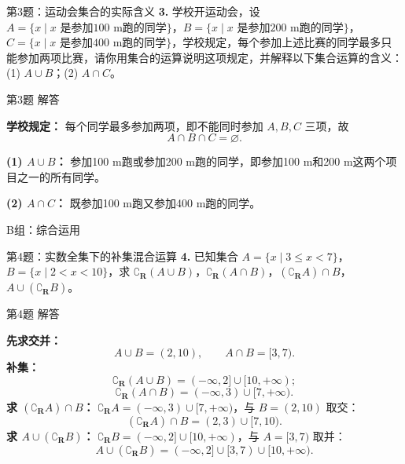 \documentclass[10pt,aspectratio=169,serif]{beamer}
\begin{document}
\begin{frame}[t]{第3题：运动会集合的实际含义}
\textbf{3.} 学校开运动会，设 $A = \{x \mid x \text{ 是参加100 m跑的同学}\}$，$B = \{x \mid x \text{ 是参加200 m跑的同学}\}$，$C = \{x \mid x \text{ 是参加400 m跑的同学}\}$，学校规定，每个参加上述比赛的同学最多只能参加两项比赛，请你用集合的运算说明这项规定，并解释以下集合运算的含义：\\
(1) $A \cup B$；\qquad (2) $A \cap C$。
\end{frame}

\begin{frame}[t]{第3题 解答}
\begin{tcolorbox}[colback=orange!10,colframe=orange,title=\textbf{解}]
\textbf{学校规定：} 每个同学最多参加两项，即不能同时参加 $A,B,C$ 三项，故
\[
A \cap B \cap C = \varnothing.
\]

\textbf{(1) $A \cup B$：} 参加100 m跑\alert{或}参加200 m跑的同学，即参加100 m和200 m这两个项目之一的所有同学。

\textbf{(2) $A \cap C$：} 既参加100 m跑\alert{又}参加400 m跑的同学。
\end{tcolorbox}
\end{frame}

\begin{frame}[t]{B组：综合运用}
\end{frame}

\begin{frame}[t]{第4题：实数全集下的补集混合运算}
\textbf{4.} 已知集合 $A = \{x \mid 3 \le x < 7\}$，$B = \{x \mid 2 < x < 10\}$，求 $\complement_{\mathbf{R}}(A \cup B)$，$\complement_{\mathbf{R}}(A \cap B)$，$(\complement_{\mathbf{R}} A) \cap B$，$A \cup (\complement_{\mathbf{R}} B)$。
\end{frame}

\begin{frame}[t]{第4题 解答}
\begin{tcolorbox}[colback=orange!10,colframe=orange,title=\textbf{解}]
\textbf{先求交并：}
\[
A \cup B = (2, 10),\qquad A \cap B = [3, 7).
\]
\textbf{补集：}
\[
\complement_{\mathbf{R}}(A\cup B) = (-\infty, 2] \cup [10, +\infty);
\]
\[
\complement_{\mathbf{R}}(A\cap B) = (-\infty, 3) \cup [7, +\infty).
\]
\textbf{求 $(\complement_{\mathbf{R}} A)\cap B$：} $\complement_{\mathbf{R}}A = (-\infty,3)\cup[7,+\infty)$，与 $B=(2,10)$ 取交：
\[
(\complement_{\mathbf{R}}A)\cap B = (2,3) \cup [7,10).
\]
\textbf{求 $A\cup(\complement_{\mathbf{R}}B)$：} $\complement_{\mathbf{R}}B = (-\infty,2]\cup[10,+\infty)$，与 $A=[3,7)$ 取并：
\[
A\cup(\complement_{\mathbf{R}}B) = (-\infty,2]\cup[3,7)\cup[10,+\infty).
\]
\end{tcolorbox}
\end{frame}
\end{document}
